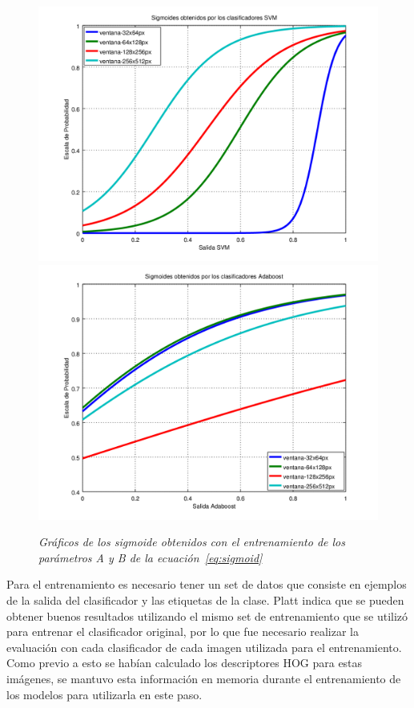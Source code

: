 \begin{figure}[H]
  \centering
  \includegraphics[scale=.4]{images/svmsig}
  \includegraphics[scale=.4]{images/boostsig}
  \caption{\em Gráficos de los sigmoide obtenidos con el entrenamiento de los parámetros A y B de la ecuación~\ref{eq:sigmoid}}  
  \label{fig:sigmoids}
\end{figure}


Para el entrenamiento es necesario tener un set de datos que consiste en ejemplos de la salida del clasificador y las etiquetas de la clase. Platt indica que se pueden obtener buenos resultados utilizando el mismo set de entrenamiento que se utilizó para entrenar el clasificador original, por lo que fue necesario realizar la evaluación con cada clasificador de cada imagen utilizada para el entrenamiento. Como previo a esto se habían calculado los descriptores HOG para estas imágenes, se mantuvo esta información en memoria durante el entrenamiento de los modelos para utilizarla en este paso.


